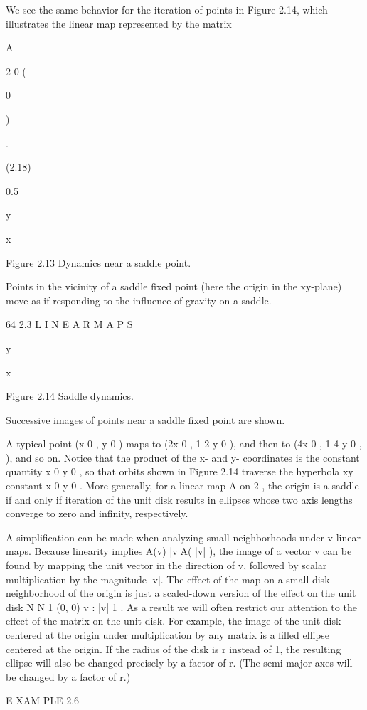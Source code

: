 \documentclass[12pt]{article}
\begin{document}
We see the same behavior for the iteration of points in Figure 2.14, which illustrates the linear map represented by the matrix

A

2 0 (

0

)

.

(2.18)

0.5

y

x

Figure 2.13 Dynamics near a saddle point.

Points in the vicinity of a saddle ﬁxed point (here the origin in the xy-plane) move as if responding to the inﬂuence of gravity on 
a saddle.

64 2.3 L I N E A R M A P S

y

x

Figure 2.14 Saddle dynamics.

Successive images of points near a saddle ﬁxed point are shown.

A typical point (x 0 , y 0 ) maps to (2x 0 , 1 2 y 0 ), and then to (4x 0 , 1 4 y 0 , ), and so on. Notice that the product of the x- 
and y- coordinates is the constant quantity x 0 y 0 , so that orbits shown in Figure 2.14 traverse the hyperbola xy  constant  x 0 y 
0 . More generally, for a linear map A on  2 , the origin is a saddle if and only if iteration of the unit disk results in ellipses 
whose two axis lengths converge to zero and inﬁnity, respectively.

A simpliﬁcation can be made when analyzing small neighborhoods under v linear maps. Because linearity implies A(v)  |v|A( |v| ), the 
image of a vector v can be found by mapping the unit vector in the direction of v, followed by scalar multiplication by the magnitude 
|v|. The effect of the map on a small disk neighborhood of the origin is just a scaled-down version of the effect on the unit disk N  
N 1 (0, 0)   v : |v|  1  . As a result we will often restrict our attention to the effect of the matrix on the unit disk. For 
example, the image of the unit disk centered at the origin under multiplication by any matrix is a ﬁlled ellipse centered at the 
origin. If the radius of the disk is r instead of 1, the resulting ellipse will also be changed precisely by a factor of r. (The 
semi-major axes will be changed by a factor of r.)

E XAM PLE 2.6
\end{document}
